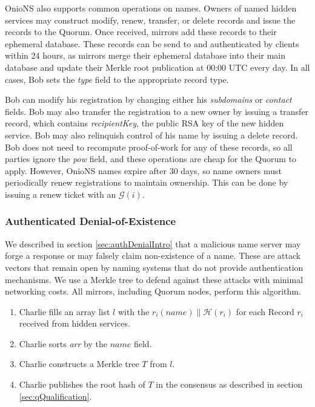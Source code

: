 \documentclass[USenglish,oneside,twocolumn]{article}
\newcommand*\concat{\mathbin{\|}}
\begin{document}

OnioNS also supports common operations on names. Owners of named hidden services may construct modify, renew, transfer, or delete records and issue the records to the Quorum. Once received, mirrors add these records to their ephemeral database. These records can be send to and authenticated by clients within 24 hours, as mirrors merge their ephemeral database into their main database and update their Merkle root publication at 00:00 UTC every day. In all cases, Bob sets the \emph{type} field to the appropriate record type.

Bob can modify his registration by changing either his \emph{subdomains} or \emph{contact} fields. Bob may also transfer the registration to a new owner by issuing a transfer record, which contains \emph{recipientKey}, the public RSA key of the new hidden service. Bob may also relinquish control of his name by issuing a delete record. Bob does not need to recompute proof-of-work for any of these records, so all parties ignore the \emph{pow} field, and these operations are cheap for the Quorum to apply. However, OnioNS names expire after 30 days, so name owners must periodically renew registrations to maintain ownership. This can be done by issuing a renew ticket with an $ \mathcal{G}(i) $.

	
\subsubsection{Authenticated Denial-of-Existence} %
\label{sec:authDenial}

We described in section \ref{sec:authDenialIntro} that a malicious name server may forge a response or may falsely claim non-existence of a name. These are attack vectors that remain open by naming systems that do not provide authentication mechanisms. We use a Merkle tree \cite{merkle1988digital} to defend against these attacks with minimal networking costs. All mirrors, including Quorum nodes, perform this algorithm.

\begin{enumerate}
	\item Charlie fills an array list $ l $ with the $ r_{i}(\mathit{name}) \concat \mathcal{H}(r_{i}) $ for each Record $ r_{i} $ received from hidden services.
	\item Charlie sorts \emph{arr} by the $ \mathit{name} $ field.
	\item Charlie constructs a Merkle tree $ T $ from $ l $.
	\item Charlie publishes the root hash of $ T $ in the consensus as described in section \ref{sec:qQualification}.
\end{enumerate}
\end{document}
